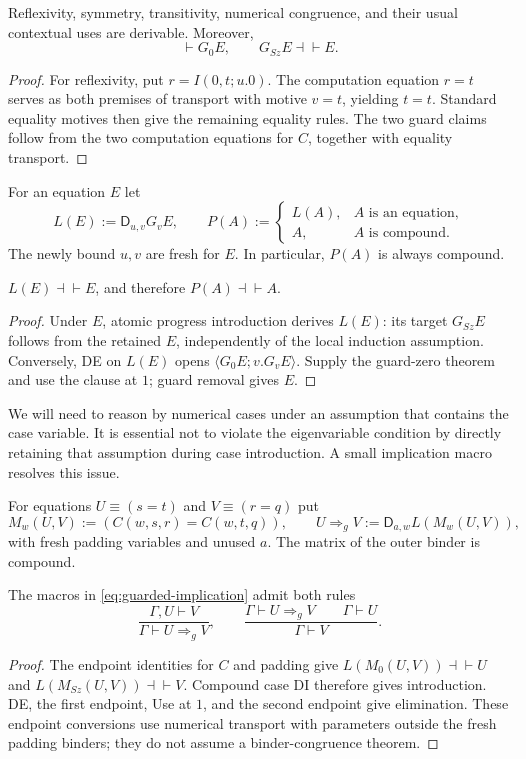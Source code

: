 \begin{lemma}
Reflexivity, symmetry, transitivity, numerical congruence, and their
usual contextual uses are derivable.  Moreover,
\[
 \vdash G_0 E,\qquad G_{Sz}E\dashv\vdash E.
\]
\end{lemma}
\begin{proof}
For reflexivity, put $r=I(0,t;u.0)$.  The computation equation $r=t$
serves as both premises of transport with motive $v=t$, yielding
$t=t$.  Standard equality motives then give the remaining equality
rules.  The two guard claims follow from the two computation equations
for $C$, together with equality transport.
\end{proof}

For an equation $E$ let
\[
 L(E):=\mathsf D_{u,v}G_v E,
 \qquad
 P(A):=
 \begin{cases}L(A),&A\text{ is an equation},\\A,&A\text{ is compound}.
 \end{cases}
\tag{Padding}\label{eq:guarded-padding}
\]
The newly bound $u,v$ are fresh for $E$.  In particular, $P(A)$ is
always compound.

\begin{lemma}[Padding]
$L(E)\dashv\vdash E$, and therefore $P(A)\dashv\vdash A$.
\end{lemma}
\begin{proof}
Under $E$, atomic progress introduction derives $L(E)$: its target
$G_{Sz}E$ follows from the retained $E$, independently of the local
induction assumption.  Conversely, DE on $L(E)$ opens
$\langle G_0E;v.G_vE\rangle$.  Supply the guard-zero theorem and use
the clause at $1$; guard removal gives $E$.
\end{proof}

We will need to reason by numerical cases under an assumption that
contains the case variable.  It is essential not to violate the
eigenvariable condition by directly retaining that assumption during
case introduction.  A small implication macro resolves this issue.

For equations $U\equiv(s=t)$ and $V\equiv(r=q)$ put
\[
 M_w(U,V):=(C(w,s,r)=C(w,t,q)),\qquad
 U\Rightarrow_g V:=\mathsf D_{a,w}L(M_w(U,V)),
\tag{Equation implication}\label{eq:guarded-implication}
\]
with fresh padding variables and unused $a$.
The matrix of the outer binder is compound.

\begin{lemma}
The macros in \eqref{eq:guarded-implication} admit both rules
\[
 \frac{\Gamma,U\vdash V}{\Gamma\vdash U\Rightarrow_g V},
 \qquad
 \frac{\Gamma\vdash U\Rightarrow_g V\qquad\Gamma\vdash U}
      {\Gamma\vdash V}.
\]
\end{lemma}
\begin{proof}
The endpoint identities for $C$ and padding give
$L(M_0(U,V))\dashv\vdash U$ and
$L(M_{Sz}(U,V))\dashv\vdash V$.
Compound case DI therefore gives introduction.  DE, the first endpoint,
Use at $1$, and the second endpoint give elimination.  These endpoint
conversions use numerical transport with parameters outside the fresh
padding binders; they do not assume a binder-congruence theorem.
\end{proof}

